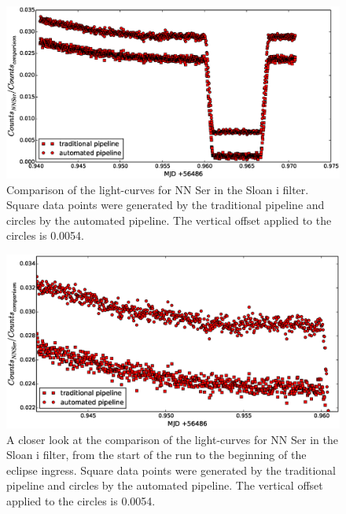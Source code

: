 \begin{figure}
\centering
\includegraphics[width=140mm]{images/nn_ser_compare_r.eps}
\caption{Comparison of the light-curves for NN Ser in the Sloan i filter. Square data points were generated by the traditional pipeline and circles by the automated pipeline. The vertical offset applied to the circles is 0.0054. }
\label{fig:comparepipelines_r}
\end{figure}

\begin{figure}
\centering
\includegraphics[width=140mm]{images/nn_ser_compare_zoom_r.eps}
\caption{A closer look at the comparison of the light-curves for NN Ser in the Sloan i filter, from the start of the run to the beginning of the eclipse ingress. Square data points were generated by the traditional pipeline and circles by the automated pipeline. The vertical offset applied to the circles is 0.0054. }
\label{fig:comparepipelines_zoom_r}
\end{figure}

